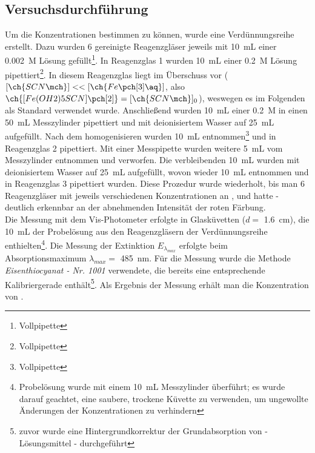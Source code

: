 \documentclass{article}
\begin{document}
    \subsection{Versuchsdurchführung} \label{sec:Versuch}
      
      Um die Konzentrationen bestimmen zu können, wurde eine Verdünnungsreihe erstellt. Dazu wurden 6 gereinigte Reagenzgläser jeweils mit \SI[mode=text]{10}{\milli\liter} einer \SI[mode=text]{0.002}{M}  Lösung gefüllt\footnote{Vollpipette}. In Reagenzglas 1 wurden \SI[mode=text]{10}{\milli\liter} einer \SI[mode=text]{0.2}{M}  Lösung pipettiert\footnote{Vollpipette}. In diesem Reagenzglas liegt  im Überschuss vor ($[\ch{SCN\mch}] << [\ch{Fe\pch[3]\aq}]$, also $\ch{[Fe(OH2)5SCN]\pch[2]} = [\ch{SCN\mch}]_{0}$), weswegen es im Folgenden als Standard verwendet wurde. Anschließend wurden \SI[mode=text]{10}{\milli\liter} einer \SI[mode=text]{0.2}{M}  in einen \SI[mode=text]{50}{\milli\liter} Messzylinder pipettiert und mit deionisiertem Wasser auf \SI[mode=text]{25}{\milli\liter} aufgefüllt. Nach dem homogenisieren wurden \SI[mode=text]{10}{\milli\liter} entnommen\footnote{Vollpipette} und in Reagenzglas 2 pipettiert. Mit einer Messpipette wurden weitere \SI[mode=text]{5}{\milli\liter} vom Messzylinder entnommen und verworfen. Die verbleibenden \SI[mode=text]{10}{\milli\liter} wurden mit deionisiertem Wasser auf \SI[mode=text]{25}{\milli\liter} aufgefüllt, wovon wieder \SI[mode=text]{10}{\milli\liter} entnommen und in Reagenzglas 3 pipettiert wurden. Diese Prozedur wurde wiederholt, bis man 6 Reagenzgläser mit jeweils verschiedenen Konzentrationen an ,  und \ch{[Fe(OH2)5SCN]\pch[2]} hatte - deutlich erkennbar an der abnehmenden Intensität der roten Färbung. \\
      
      Die Messung mit dem Vis-Photometer erfolgte in Glasküvetten ($d =$ \SI[mode=text]{1.6}{\centi\meter}), die \SI[mode=text]{10}{\milli\liter} der Probelösung aus den Reagenzgläsern der Verdünnungsreihe enthielten\footnote{Probelösung wurde mit einem \SI[mode=text]{10}{\milli\liter} Messzylinder überführt; es wurde darauf geachtet, eine saubere, trockene Küvette zu verwenden, um ungewollte Änderungen der Konzentrationen zu verhindern}. Die Messung der Extinktion $E_{\lambda _{max}}$ erfolgte beim Absorptionsmaximum $\lambda _{max} = $ \SI[mode=text]{485}{\nano\meter}. Für die Messung wurde die Methode \textit{Eisenthiocyanat - Nr. 1001} verwendete, die bereits eine entsprechende Kalibriergerade enthält\footnote{zuvor wurde eine Hintergrundkorrektur der Grundabsorption von  - Lösungsmittel - durchgeführt}. Als Ergebnis der Messung erhält man die Konzentration von \ch{[Fe(OH2)5SCN]\pch[2]}. 
     
\end{document}
